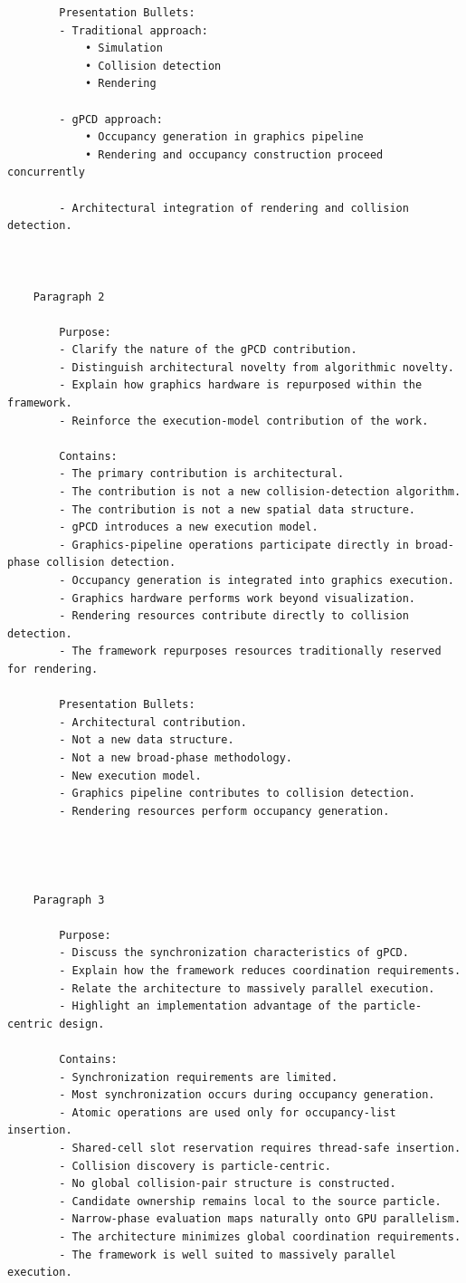 \begin{verbatim}
		Presentation Bullets:
		- Traditional approach:
			• Simulation
			• Collision detection
			• Rendering

		- gPCD approach:
			• Occupancy generation in graphics pipeline
			• Rendering and occupancy construction proceed concurrently

		- Architectural integration of rendering and collision detection.



	Paragraph 2

		Purpose:
		- Clarify the nature of the gPCD contribution.
		- Distinguish architectural novelty from algorithmic novelty.
		- Explain how graphics hardware is repurposed within the framework.
		- Reinforce the execution-model contribution of the work.

		Contains:
		- The primary contribution is architectural.
		- The contribution is not a new collision-detection algorithm.
		- The contribution is not a new spatial data structure.
		- gPCD introduces a new execution model.
		- Graphics-pipeline operations participate directly in broad-phase collision detection.
		- Occupancy generation is integrated into graphics execution.
		- Graphics hardware performs work beyond visualization.
		- Rendering resources contribute directly to collision detection.
		- The framework repurposes resources traditionally reserved for rendering.

		Presentation Bullets:
		- Architectural contribution.
		- Not a new data structure.
		- Not a new broad-phase methodology.
		- New execution model.
		- Graphics pipeline contributes to collision detection.
		- Rendering resources perform occupancy generation.




	Paragraph 3

		Purpose:
		- Discuss the synchronization characteristics of gPCD.
		- Explain how the framework reduces coordination requirements.
		- Relate the architecture to massively parallel execution.
		- Highlight an implementation advantage of the particle-centric design.

		Contains:
		- Synchronization requirements are limited.
		- Most synchronization occurs during occupancy generation.
		- Atomic operations are used only for occupancy-list insertion.
		- Shared-cell slot reservation requires thread-safe insertion.
		- Collision discovery is particle-centric.
		- No global collision-pair structure is constructed.
		- Candidate ownership remains local to the source particle.
		- Narrow-phase evaluation maps naturally onto GPU parallelism.
		- The architecture minimizes global coordination requirements.
		- The framework is well suited to massively parallel execution.


\end{verbatim}
